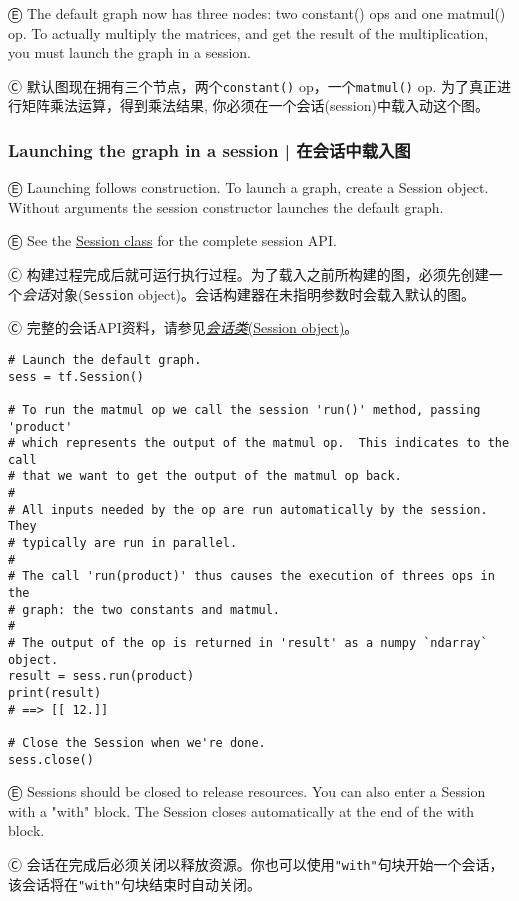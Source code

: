 Ⓔ \textcolor{etc}{The default graph now has three nodes: two constant() ops and one matmul() op. To actually multiply the matrices, and get the result of the multiplication, you must launch the graph in a session.}

Ⓒ 默认图现在拥有三个节点，两个\lstinline{constant()} op，一个\lstinline{matmul()} op. 为了真正进行矩阵乘法运算，得到乘法结果, 你必须在一个会话(session)中载入动这个图。


\subsubsection {Launching the graph in a session  |  在会话中载入图} \label{launching_graph}

Ⓔ \textcolor{etc}{Launching follows construction. To launch a graph, create a Session object. Without arguments the session constructor launches the default graph.}

Ⓔ \textcolor{etc}{See the \hyperref[class-tf.session]{Session class} for the complete session API.}

Ⓒ 构建过程完成后就可运行执行过程。为了载入之前所构建的图，必须先创建一个\emph{会话}对象(\lstinline{Session} object)。会话构建器在未指明参数时会载入默认的图。

Ⓒ 完整的会话API资料，请参见\hyperref[class-tf.session]{\emph{会话类}(Session object)}。

\begin{lstlisting}
# Launch the default graph.
sess = tf.Session()

# To run the matmul op we call the session 'run()' method, passing 'product'
# which represents the output of the matmul op.  This indicates to the call
# that we want to get the output of the matmul op back.
#
# All inputs needed by the op are run automatically by the session.  They
# typically are run in parallel.
#
# The call 'run(product)' thus causes the execution of threes ops in the
# graph: the two constants and matmul.
#
# The output of the op is returned in 'result' as a numpy `ndarray` object.
result = sess.run(product)
print(result)
# ==> [[ 12.]]

# Close the Session when we're done.
sess.close()
\end{lstlisting}

Ⓔ \textcolor{etc}{Sessions should be closed to release resources. You can also enter a Session with a "with" block. The Session closes automatically at the end of the with block.}

Ⓒ 会话在完成后必须关闭以释放资源。你也可以使用\lstinline{"with"}句块开始一个会话，该会话将在\lstinline{"with"}句块结束时自动关闭。


